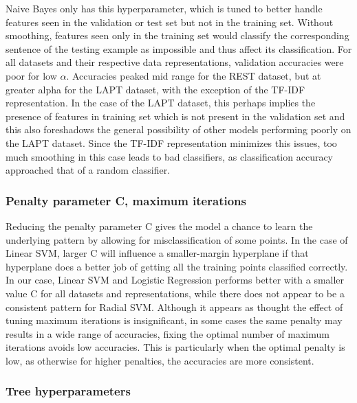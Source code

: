\documentclass[comsoc,conference]{IEEEtran}
\begin{document}
Naive Bayes only has this hyperparameter, which is tuned to better handle features seen in the validation or test set but not in the training set. Without smoothing, features seen only in the training set would classify the corresponding sentence of the testing example as impossible and thus affect its classification. For all datasets and their respective data representations, validation accuracies were poor for low $\alpha$. Accuracies peaked mid range for the REST dataset, but at greater alpha for the LAPT dataset, with the exception of the TF-IDF representation. In the case of the LAPT dataset, this perhaps implies the presence of features in training set which is not present in the validation set and this also foreshadows the general possibility of other models performing poorly on the LAPT dataset. Since the TF-IDF representation minimizes this issues, too much smoothing in this case leads to bad classifiers, as classification accuracy approached that of a random classifier. 

\subsubsection{Penalty parameter C, maximum iterations}

Reducing the penalty parameter C gives the model a chance to learn the underlying pattern by allowing for misclassification of some points. In the case of Linear SVM, larger C will influence a smaller-margin hyperplane if that hyperplane does a better job of getting all the training points classified correctly. In our case, Linear SVM and Logistic Regression performs better with a smaller value C for all datasets and representations, while there does not appear to be a consistent pattern for Radial SVM. Although it appears as thought the effect of tuning maximum iterations is insignificant, in some cases the same penalty may results in a wide range of accuracies, fixing the optimal number of maximum iterations avoids low accuracies. This is particularly when the optimal penalty is low, as otherwise for higher penalties, the accuracies are more consistent.

\subsubsection{Tree hyperparameters}
\end{document}
